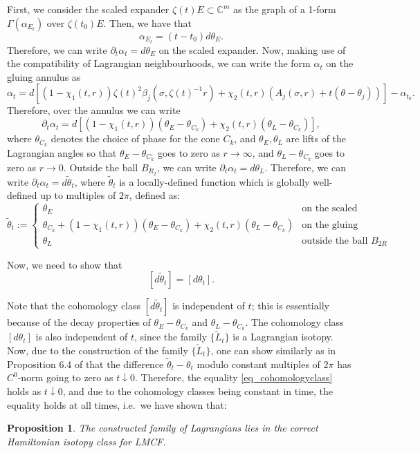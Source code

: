 \documentclass[10pt, a4paper]{article}
\theoremstyle{plain}%
\newtheorem{prop}[theorem]{Proposition}
\theoremstyle{definition}
\numberwithin{figure}{section}
\numberwithin{equation}{section}
\newcommand{\bC}{\mathbb{C}}
\newcommand{\pa}{\partial}
\newcommand{\rt}{\rightarrow}
\newcommand{\tL}{\widetilde{L}}
\newcommand{\tth}{\widetilde{\theta}}
\begin{document}
 First, we consider the scaled expander $\zeta(t)E\subset \bC^m$ as the graph of a 1-form $\Gamma(\alpha_{E_t})$ over $\zeta(t_0) E$. Then, we have that \[
 \alpha_{E_t} = (t-t_0)d\theta_E.
 \] 
 Therefore, we can write $\pa_t\alpha_t = d\theta_E$ on the scaled expander. Now, making use of the compatibility of Lagrangian neighbourhoods, we can write the form $\alpha_t$ on the gluing annulus as \[
 \alpha_t = d[(1-\chi_1(t,r)){\zeta(t)}^2\beta_j(\sigma,{\zeta(t)}^{-1}r)+\chi_2(t,r)(A_j(\sigma,r)+t(\theta-\theta_j))] - \alpha_{t_0}.
 \]
 Therefore, over the annulus we can write
 \[
 \pa_t\alpha_t = d[(1-\chi_1(t,r))(\theta_E-\theta_{C_k}) + \chi_2(t,r)(\theta_L-\theta_{C_k})],
 \]
 where $\theta_{C_k}$ denotes the choice of phase for the cone $C_k$, and $\theta_E,\theta_L$ are lifts of the Lagrangian angles so that $\theta_E-\theta_{C_k}$ goes to zero as $r\rt \infty$, and $\theta_L-\theta_{C_k}$ goes to zero as $r\rt 0$. Outside the ball $B_{R_2}$, we can write $\pa_t\alpha_t = d\theta_L$. Therefore, we can write $\pa_t\alpha_t = d\tth_t$, where $\tth_t$ is a locally-defined function which is globally well-defined up to multiples of $2\pi$, defined as:
 \begin{equation*}
 	\tth_t:=
 	\begin{cases} 
 		\theta_E & \textrm{on the scaled expander} \\
 		\theta_{C_k}+(1-\chi_1(t,r))(\theta_E-\theta_{C_k}) + \chi_2(t,r)(\theta_L-\theta_{C_k}) & \textrm{on the gluing annulus} \\
 		\theta_L & \textrm{outside the ball $B_{2R}$}
 	\end{cases}
 \end{equation*}
 
  Now, we need to show that \begin{equation}\label{eq_cohomologyclass}
 [d\tth_t]=[d\theta_t].
 \end{equation}

 Note that the cohomology class $[d\tth_t]$ is independent of $t$; this is essentially because of the decay properties of $\theta_E-\theta_{C_k}$ and $\theta_L-\theta_{C_k}$. The cohomology class $[d\theta_t]$ is also independent of $t$, since the family $\{\tL_t\}$ is a Lagrangian isotopy. Now, due to the construction of the family $\{\tL_t\}$, one can show similarly as in Proposition 6.4 of \cite{Joy04} that the difference $\tth_t-\theta_t$ modulo constant multiples of $2\pi$ has $C^0$-norm going to zero as $t\downarrow 0$. Therefore, the equality \eqref{eq_cohomologyclass} holds as $t\downarrow 0$, and due to the cohomology classes being constant in time, the equality holds at all times, i.e.\ we have shown that:
 \begin{prop}\label{prop_hamiltonisotopy1}
 	The constructed family of Lagrangians lies in the correct Hamiltonian isotopy class for LMCF. 
 \end{prop}
\end{document}
